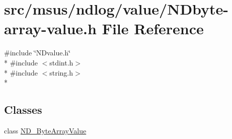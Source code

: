 \hypertarget{_n_dbyte-array-value_8h}{\section{src/msus/ndlog/value/\-N\-Dbyte-\/array-\/value.h File Reference}
\label{_n_dbyte-array-value_8h}
}
{\ttfamily \#include \char`\"{}N\-Dvalue.\-h\char`\"{}}\\*
{\ttfamily \#include $<$stdint.\-h$>$}\\*
{\ttfamily \#include $<$string.\-h$>$}\\*
\subsection*{Classes}
\begin{DoxyCompactItemize}
\item 
class \hyperlink{class_n_d___byte_array_value}{N\-D\-\_\-\-Byte\-Array\-Value}
\end{DoxyCompactItemize}
